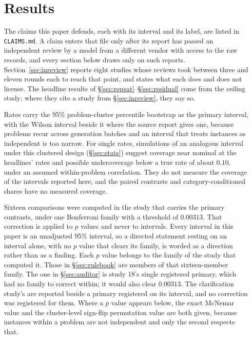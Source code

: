 \section{Results}
\label{sec:results}
The claims this paper defends, each with its interval and its label, are listed in
\texttt{CLAIMS.md}. A claim enters that file only after its report has passed an independent
review by a model from a different vendor with access to the raw records, and every section below
draws only on such reports. Section~\ref{sec:inreview} reports eight studies whose reviews took
between three and eleven rounds each to reach that point, and states what each does and does not
license. The headline results of \S\ref{sec:repeat}--\S\ref{sec:residual} come from the ceiling
study; where they cite a study from \S\ref{sec:inreview}, they say so.

Rates carry the 95\% problem-cluster percentile bootstrap as the primary interval, with the
Wilson interval beside it where the source report gives one, because problems recur across
generation batches and an interval that treats instances as independent is too narrow. For single
rates, simulations of an analogous interval under this clustered design (\S\ref{sec:stats})
suggest coverage near nominal at the headlines' rates and possible undercoverage below a true rate
of about $0.10$, under an assumed within-problem correlation. They do not measure the coverage of
the intervals reported here, and the paired contrasts and category-conditioned shares have no
measured coverage.

Sixteen comparisons were computed in the study that carries the primary contrasts, under one
Bonferroni family with a threshold of $0.00313$. That correction is applied to $p$ values and
never to intervals. Every interval in this paper is an unadjusted 95\% interval, so a directed
statement resting on an interval alone, with no $p$ value that clears its family, is worded as a
direction rather than as a finding. Each $p$ value belongs to the family of the study that computed
it. Those in \S\ref{sec:rulebook} are members of that sixteen-member family. The one in
\S\ref{sec:auditor} is study 18's single registered primary, which had no family to correct
within; it would also clear $0.00313$. The clarification study's are reported beside a primary
registered on its interval, and no correction was registered for them. Where a $p$ value appears
below, the exact McNemar value and the cluster-level sign-flip permutation value are both given,
because instances within a problem are not independent and only the second respects that.

